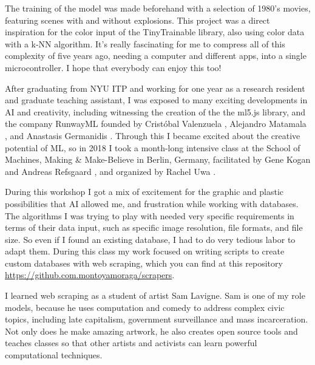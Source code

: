 The training of the model was made beforehand with a selection of 1980's movies, featuring scenes with and without explosions. This project was a direct inspiration for the color input of the TinyTrainable library, also using color data with a \acrshort{k-NN} algorithm. It's really fascinating for me to compress all of this complexity of five years ago, needing a computer and different apps, into a single microcontroller. I hope that everybody can enjoy this too!

After graduating from \acrshort{NYU} \acrshort{ITP} and working for one year as a research resident and graduate teaching assistant, I was exposed to many exciting developments in \acrshort{AI} and creativity, including witnessing the creation of the the ml5.js library, and the company RunwayML \cite{website-runwayml} founded by Cristóbal Valenzuela \cite{website-cristobal-valenzuela}, Alejandro Matamala \cite{website-alejandro-matamala}, and Anastasis Germanidis \cite{website-anastasis-germanidis}. Through this I became excited about the creative potential of \acrshort{ML}, so in 2018 I took a month-long intensive class at the School of Machines, Making \& Make-Believe \cite{website-school-of-machines} in Berlin, Germany, facilitated by Gene Kogan and Andreas Refsgaard \cite{website-andreas-refsgaard}, and organized by Rachel Uwa \cite{website-rachel-uwa}.

During this workshop I got a mix of excitement for the graphic and plastic possibilities that \acrshort{AI} allowed me, and frustration while working with databases. The algorithms I was trying to play with needed very specific requirements in terms of their data input, such as specific image resolution, file formats,  and file size. So even if I found an existing database, I had to do very tedious labor to adapt them. During this class my work focused on writing scripts to create custom databases with web \gls{scraping}, which you can find at this repository \url{https://github.com.montoyamoraga/scrapers}.

I learned web scraping as a student of artist Sam Lavigne. Sam is one of my role models, because he uses computation and comedy to address complex civic topics, including late capitalism, government surveillance and mass incarceration. Not only does he make amazing artwork, he also creates open source tools and teaches classes so that other artists and activists can learn powerful computational techniques.

